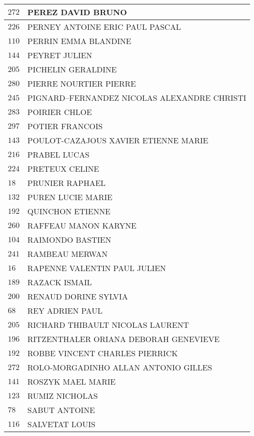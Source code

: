\begin{xltabular}{\linewidth}{|l|X|}
    \hline
    $272$ & PEREZ DAVID BRUNO \\
    \hline
    $226$ & PERNEY ANTOINE ERIC PAUL PASCAL \\
    \hline
    $110$ & PERRIN EMMA BLANDINE \\
    \hline
    $144$ & PEYRET JULIEN \\
    \hline
    $205$ & PICHELIN GERALDINE \\
    \hline
    $280$ & PIERRE NOURTIER PIERRE \\
    \hline
    $245$ & PIGNARD--FERNANDEZ NICOLAS ALEXANDRE CHRISTI \\
    \hline
    $283$ & POIRIER CHLOE \\
    \hline
    $297$ & POTIER FRANCOIS \\
    \hline
    $143$ & POULOT-CAZAJOUS XAVIER ETIENNE MARIE \\
    \hline
    $216$ & PRABEL LUCAS \\
    \hline
    $224$ & PRETEUX CELINE \\
    \hline
    $18$ & PRUNIER RAPHAEL \\
    \hline
    $132$ & PUREN LUCIE MARIE \\
    \hline
    $192$ & QUINCHON ETIENNE \\
    \hline
    $260$ & RAFFEAU MANON KARYNE \\
    \hline
    $104$ & RAIMONDO BASTIEN \\
    \hline
    $241$ & RAMBEAU MERWAN \\
    \hline
    $16$ & RAPENNE VALENTIN PAUL JULIEN \\
    \hline
    $189$ & RAZACK ISMAIL \\
    \hline
    $200$ & RENAUD DORINE SYLVIA \\
    \hline
    $68$ & REY ADRIEN PAUL \\
    \hline
    $205$ & RICHARD THIBAULT NICOLAS LAURENT \\
    \hline
    $196$ & RITZENTHALER ORIANA DEBORAH GENEVIEVE \\
    \hline
    $192$ & ROBBE VINCENT CHARLES PIERRICK \\
    \hline
    $272$ & ROLO-MORGADINHO ALLAN ANTONIO GILLES \\
    \hline
    $141$ & ROSZYK MAEL MARIE \\
    \hline
    $123$ & RUMIZ NICHOLAS \\
    \hline
    $78$ & SABUT ANTOINE \\
    \hline
    $116$ & SALVETAT LOUIS \\

\end{xltabular}
